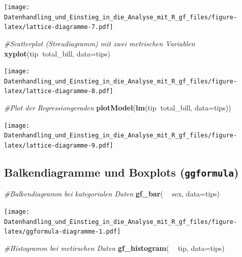 \documentclass[10pt,ngerman,onside]{article}
\newenvironment{Shaded}{\begin{snugshade}}{\end{snugshade}}
\newcommand{\KeywordTok}[1]{\textcolor[rgb]{0.13,0.29,0.53}{\textbf{#1}}}
\newcommand{\DataTypeTok}[1]{\textcolor[rgb]{0.13,0.29,0.53}{#1}}
\newcommand{\StringTok}[1]{\textcolor[rgb]{0.31,0.60,0.02}{#1}}
\newcommand{\CommentTok}[1]{\textcolor[rgb]{0.56,0.35,0.01}{\textit{#1}}}
\newcommand{\OperatorTok}[1]{\textcolor[rgb]{0.81,0.36,0.00}{\textbf{#1}}}
\newcommand{\NormalTok}[1]{#1}
\begin{document}
\texttt{[image: Datenhandling\_und\_Einstieg\_in\_die\_Analyse\_mit\_R\_gf\_files/figure-latex/lattice-diagramme-7.pdf]}

\begin{Shaded}
\begin{Highlighting}[]
\CommentTok{#Scatterplot (Streudiagramm) mit zwei metrischen Variablen}
\KeywordTok{xyplot}\NormalTok{(tip}\OperatorTok{~}\NormalTok{total_bill, }\DataTypeTok{data=}\NormalTok{tips)}
\end{Highlighting}
\end{Shaded}

\texttt{[image: Datenhandling\_und\_Einstieg\_in\_die\_Analyse\_mit\_R\_gf\_files/figure-latex/lattice-diagramme-8.pdf]}

\begin{Shaded}
\begin{Highlighting}[]
\CommentTok{#Plot der Regressiongeraden}
\KeywordTok{plotModel}\NormalTok{(}\KeywordTok{lm}\NormalTok{(tip}\OperatorTok{~}\NormalTok{total_bill, }\DataTypeTok{data=}\NormalTok{tips))}
\end{Highlighting}
\end{Shaded}

\texttt{[image: Datenhandling\_und\_Einstieg\_in\_die\_Analyse\_mit\_R\_gf\_files/figure-latex/lattice-diagramme-9.pdf]}

\hypertarget{balkendiagramme-und-boxplots-ggformula}{%
\subsection{\texorpdfstring{Balkendiagramme und Boxplots
(\texttt{ggformula})}{Balkendiagramme und Boxplots (ggformula)}}\label{balkendiagramme-und-boxplots-ggformula}}

\begin{Shaded}
\begin{Highlighting}[]
\CommentTok{#Balkendiagramm bei kategorialen Daten}
\KeywordTok{gf_bar}\NormalTok{( }\OperatorTok{~}\StringTok{ }\NormalTok{sex, }\DataTypeTok{data=}\NormalTok{tips)}
\end{Highlighting}
\end{Shaded}

\texttt{[image: Datenhandling\_und\_Einstieg\_in\_die\_Analyse\_mit\_R\_gf\_files/figure-latex/ggformula-diagramme-1.pdf]}

\begin{Shaded}
\begin{Highlighting}[]
\CommentTok{#Histogramm bei metirschen Daten}
\KeywordTok{gf_histogram}\NormalTok{( }\OperatorTok{~}\StringTok{ }\NormalTok{tip, }\DataTypeTok{data=}\NormalTok{tips)}
\end{Highlighting}
\end{Shaded}
\end{document}
